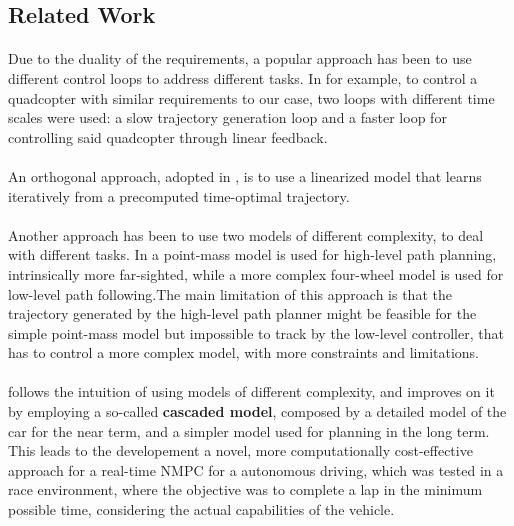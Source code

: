 \documentclass[a4paper, onecolumn, 12pt]{article}
\begin{document}
\subsection*{Related Work}
\paragraph*{} Due to the duality of the requirements, a popular approach has been
to use different control loops to address different tasks. In \cite{Gros2007}
for example, to control a quadcopter with similar requirements to our case, two
loops with different time scales were used: a slow trajectory generation loop
and a faster loop for controlling said quadcopter through linear feedback.
\paragraph*{} An orthogonal approach, adopted in \cite{rosolia}, is to use a
linearized model that learns iteratively from a precomputed time-optimal
trajectory.
\paragraph*{} Another approach has been to use two models of different 
complexity, to deal with different tasks. In \cite{Gao2010} a point-mass model
is used for high-level path planning, intrinsically more far-sighted, while a
more complex four-wheel model is used for low-level path following.The main
limitation of this approach is that the trajectory generated by the high-level
path planner might be feasible for the simple point-mass model but impossible to
track by the low-level controller, that has to control a more complex model,
with more constraints and limitations.
\paragraph*{}\cite{paper} follows the intuition of using models of different complexity, and
improves on it by employing a so-called \textbf{cascaded model}, composed by a
detailed model of the car for the near term, and a simpler model used for
planning in the long term. This leads to the developement a novel, more
computationally cost-effective approach for a real-time NMPC for a autonomous
driving, which was tested in a race environment, where the objective was to
complete a lap in the minimum possible time, considering the actual capabilities
of the vehicle. 
\end{document}
